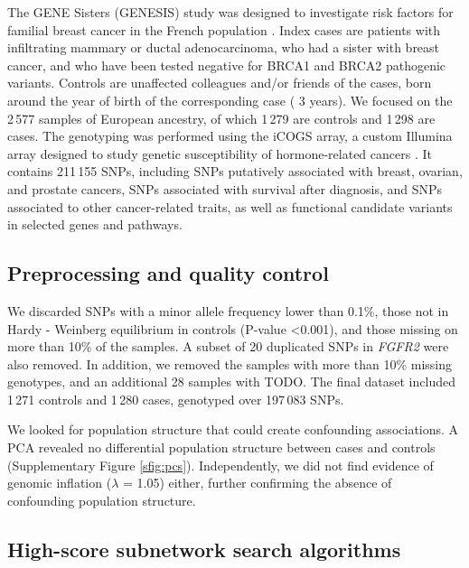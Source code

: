 \documentclass[twocolumn, 10pt]{article}
\begin{document}
The GENE Sisters (GENESIS) study was designed to investigate risk factors for familial breast cancer in the French population \cite{sinilnikova_genesis:_2016}. Index cases are patients with infiltrating mammary or ductal adenocarcinoma, who had a sister with breast cancer, and who have been tested negative for BRCA1 and BRCA2 pathogenic variants. Controls are unaffected colleagues and/or friends of the cases, born around the year of birth of the corresponding case (\textpm{} 3 years). We focused on the 2\,577 samples of European ancestry, of which 1\,279 are controls and 1\,298 are cases. The genotyping was performed using the iCOGS array, a custom Illumina array designed to study genetic susceptibility of hormone-related cancers \cite{sakoda_turning_2013}. It contains 211\,155 SNPs, including SNPs putatively associated with breast, ovarian, and prostate cancers, SNPs associated with survival after diagnosis, and SNPs associated to other cancer-related traits, as well as functional candidate variants in selected genes and pathways.

\subsection{Preprocessing and quality control}
\label{sec:orgd26c48b}

We discarded SNPs with a minor allele frequency lower than 0.1\%, those not in Hardy - Weinberg equilibrium in controls (P-value \textless 0.001), and those missing on more than 10\% of the samples. A subset of 20 duplicated SNPs in \emph{FGFR2} were also removed. In addition, we removed the samples with more than 10\% missing genotypes, and an additional 28 samples with TODO. The final dataset included 1\,271 controls and 1\,280 cases, genotyped over 197\,083 SNPs. 

We looked for population structure that could create confounding associations. A PCA revealed no differential population structure between cases and controls (Supplementary Figure \ref{sfig:pcs}). Independently, we did not find evidence of genomic inflation (\(\lambda\) = 1.05) either, further confirming the absence of confounding population structure.

\subsection{High-score subnetwork search algorithms}
\label{sec:org6ced6c9}
\end{document}
